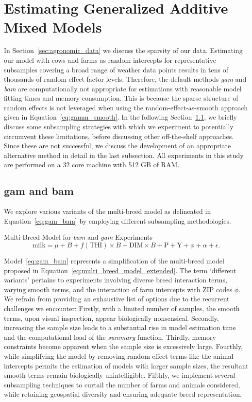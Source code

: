 \section{Estimating Generalized Additive Mixed Models}\label{sec:estimating_gams}
In Section~\ref{sec:agronomic_data} we discuss the sparsity of our data. Estimating our model with cows and farms as random intercepts for representative subsamples covering a broad range of weather data points results in tens of thousands of random effect factor levels. Therefore, the default methods \textit{gam} and \textit{bam} are computationally not appropriate for estimations with reasonable model fitting times and memory consumption. This is because the sparse structure of random effects is not leveraged when using the random-effect-as-smooth approach given in Equation~\ref{eq:gamm_smooth}. In the following Section~\ref{sec:gam_bam}, we briefly discuss some subsampling strategies with which we experiment to potentially circumvent these limitations, before discussing other off-the-shelf approaches. Since these are not successful, we discuss the development of an appropriate alternative method in detail in the last subsection. All experiments in this study are performed on a 32 core machine with 512 GB of RAM.

\subsection{gam and bam}\label{sec:gam_bam}
We explore various variants of the multi-breed model as delineated in Equation~\ref{eq:gam_bam} by employing different subsampling methodologies. 
\begin{defi}  Multi-Breed Model for \textit{bam} and \textit{gam} Experiments
    \begin{equation}\label{eq:gam_bam}
    \text{milk} = \mu + B + f(\text{THI})\times B + \text{DIM}\times B + \text{P} + \text{Y} + \phi + \alpha + \epsilon.
\end{equation}
\end{defi}
Model~\ref{eq:gam_bam} represents a simplification of the multi-breed model proposed in Equation~\ref{eq:multi_breed_model_extended}. The term ‘different variants’ pertains to experiments involving diverse breed interaction terms, varying smooth terms, and the interaction of farm intercepts with ZIP codes $\phi$. We refrain from providing an exhaustive list of options due to the recurrent challenges we encounter: Firstly, with a limited number of samples, the smooth terms, upon visual inspection, appear biologically nonsensical. Secondly, increasing the sample size leads to a substantial rise in model estimation time and the computational load of the \textit{summary} function. Thirdly, memory constraints become apparent when the sample size is excessively large. Fourthly, while simplifying the model by removing random effect terms like the animal intercepts permits the estimation of models with larger sample sizes, the resultant smooth terms remain biologically unintelligible. Fifthly, we implement several subsampling techniques to curtail the number of farms and animals considered, while retaining geospatial diversity and ensuring adequate breed representation.

